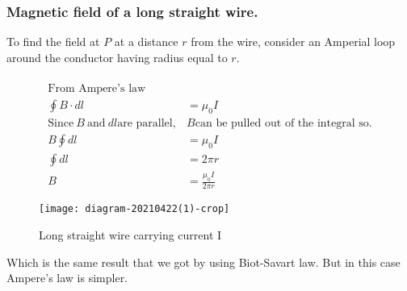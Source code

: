 \subsubsection{Magnetic field of a long straight wire. }
To find the field at $P$ at a distance $r$ from the wire, consider an Amperial loop around the conductor having radius equal to $r$.\\
\begin{minipage}{0.65\textwidth}
\begin{align*}\\
\text{From Ampere's law }\\
\oint B\cdot dl&=\mu_0 I\\
\text{Since}\ B \ \text{and} \ dl \text{are parallel} , &B\text{can be pulled out of the integral so.}\\
B\oint dl&=\mu_0 I \hspace{2cm} \\ \oint dl&=2\pi r\\
B&=\frac{\mu_0 I}{2\pi r}
\end{align*}
\end{minipage}
\begin{minipage}{0.35\textwidth}
	\begin{figure}[H]
		\centering
		\texttt{[image: diagram-20210422(1)-crop]}
		\caption{Long straight wire carrying current I}
		\label{Long straight wire}
	\end{figure}
\end{minipage}


Which is the same result that we got by using Biot-Savart law. But in this case Ampere's law is simpler.\\
